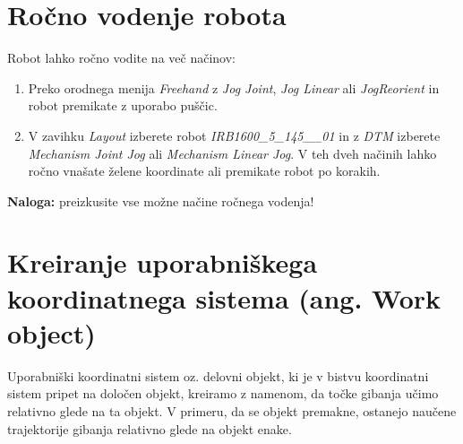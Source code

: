 \section{Ročno vodenje robota}

Robot lahko ročno vodite na več načinov:

\begin{enumerate}
\item \vspace*{-0.2cm} Preko orodnega menija \emph{Freehand} z
\emph{Jog Joint}, \emph{Jog Linear} ali \emph{JogReorient} in robot
premikate z uporabo puščic.


\item \vspace*{-0.2cm}  V zavihku \emph{Layout} izberete robot
\emph{IRB1600\_5\_145\_\_01} in z \emph{DTM} izberete
\emph{Mechanism Joint Jog} ali \emph{Mechanism Linear Jog}. V teh
dveh načinih lahko ročno vnašate želene koordinate ali premikate
robot po korakih.

\end{enumerate}


\textbf{Naloga:} preizkusite vse možne načine ročnega vodenja!

\section{Kreiranje uporabniškega koordinatnega sistema (ang. Work object)}

Uporabniški koordinatni sistem oz. delovni objekt, ki je v bistvu koordinatni
sistem pripet na določen objekt, kreiramo z namenom, da točke gibanja učimo
relativno glede na ta objekt.  V primeru, da se objekt premakne, ostanejo
naučene trajektorije gibanja relativno glede na objekt enake.
\newline

